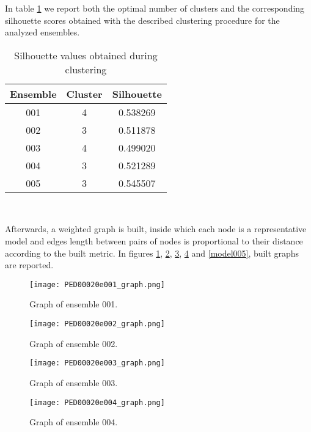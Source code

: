 In table \ref{tab:silhouette} we report both the optimal number of clusters and the corresponding silhouette scores obtained with the described clustering procedure for the analyzed ensembles.

\begin{table}[H]
\begin{center}
\begin{tabular}{ccc}
\textbf{Ensemble} & \textbf{Cluster} & \textbf{Silhouette}\\
\hline
001 & 4 & 0.538269\\
\hline
002 & 3 & 0.511878\\
\hline
003 & 4 & 0.499020\\
\hline
004 & 3 & 0.521289\\
\hline
005 & 3 & 0.545507\\
\end{tabular}
\end{center}
\caption{Silhouette values obtained during clustering}~\label{tab:silhouette}
\end{table}

Afterwards, a weighted graph is built, inside which each node is a representative model and edges length between pairs of nodes is proportional to their distance according to the built metric. In figures \ref{model001}, \ref{model002}, \ref{model003}, \ref{model004} and \ref{model005}, built graphs are reported.

\begin{figure}[H]
    \centering
	\texttt{[image: PED00020e001\_graph.png]}
	\caption{Graph of ensemble 001.}
	\label{model001}
\end{figure}

\begin{figure}[H]
    \centering
		\texttt{[image: PED00020e002\_graph.png]}
		\caption{Graph of ensemble 002.}
		\label{model002}
\end{figure}

\begin{figure}[H]
    \centering
		\texttt{[image: PED00020e003\_graph.png]}
		\caption{Graph of ensemble 003.}
		\label{model003}
\end{figure}

\begin{figure}[H]
    \centering
		\texttt{[image: PED00020e004\_graph.png]}
		\caption{Graph of ensemble 004.}
		\label{model004}
\end{figure}


